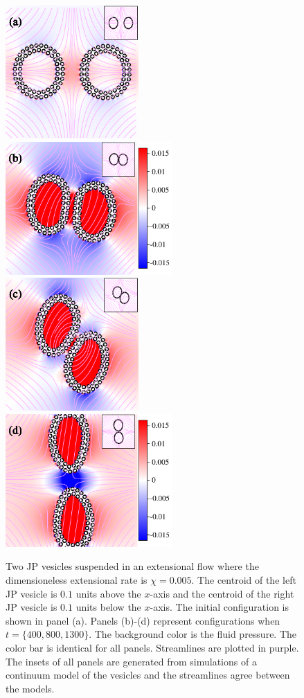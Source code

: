 \documentclass[lineno]{jfm}
\begin{document}
\begin{figure}
\centering
\includegraphics[height=2in]{N116_ext_0.pdf}
\includegraphics[height=2in]{N116_ext_2000.pdf}\\
\includegraphics[height=2in]{N116_ext_4000.pdf}
\includegraphics[height=2in]{N116_ext_6500.pdf}
  \caption{\label{figure12} Two JP vesicles suspended in an
  extensional flow where the dimensioneless extensional rate is
  $\chi=0.005$. The centroid of the left JP vesicle is $0.1$ units
  above the $x$-axis and the centroid of the right JP vesicle is
  $0.1$ units below the $x$-axis. The initial configuration is shown in
  panel (a). Panels (b)-(d) represent configurations when $t = \{400, 800, 1300\}$. 
  The background color is the fluid pressure. The color bar
  is identical for all panels. Streamlines are plotted in purple. The
  insets of all panels are generated from simulations of a continuum
  model of the vesicles and the streamlines agree between the models.}
\end{figure}
\end{document}
